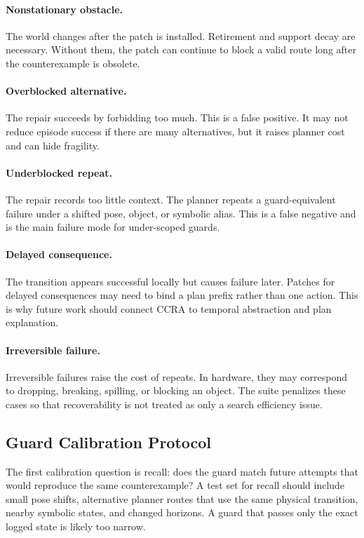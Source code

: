 \documentclass{article}
\newcommand{\ccra}{\textsc{CCRA}}
\begin{document}
\paragraph{Nonstationary obstacle.}
The world changes after the patch is installed. Retirement and support decay
are necessary. Without them, the patch can continue to block a valid route long
after the counterexample is obsolete.

\paragraph{Overblocked alternative.}
The repair succeeds by forbidding too much. This is a false positive. It may
not reduce episode success if there are many alternatives, but it raises
planner cost and can hide fragility.

\paragraph{Underblocked repeat.}
The repair records too little context. The planner repeats a guard-equivalent
failure under a shifted pose, object, or symbolic alias. This is a false
negative and is the main failure mode for under-scoped guards.

\paragraph{Delayed consequence.}
The transition appears successful locally but causes failure later. Patches for
delayed consequences may need to bind a plan prefix rather than one action.
This is why future work should connect \ccra{} to temporal abstraction and plan
explanation.

\paragraph{Irreversible failure.}
Irreversible failures raise the cost of repeats. In hardware, they may
correspond to dropping, breaking, spilling, or blocking an object. The suite
penalizes these cases so that recoverability is not treated as only a search
efficiency issue.

\subsection{Guard Calibration Protocol}

The first calibration question is recall: does the guard match future attempts
that would reproduce the same counterexample? A test set for recall should
include small pose shifts, alternative planner routes that use the same physical
transition, nearby symbolic states, and changed horizons. A guard that passes
only the exact logged state is likely too narrow.
\end{document}
